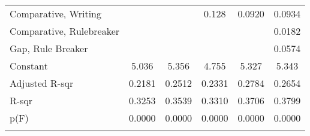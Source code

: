 {\begin{center}
{\begin{longtable}{l*{5}{c}}
Comparative, Writing &                     &                     &       0.128         &      0.0920         &      0.0934         \\
\addlinespace
Comparative, Rulebreaker &                     &                     &                     &                     &      0.0182         \\
\addlinespace
Gap, Rule Breaker        &                     &                     &                     &                     &      0.0574         \\
\addlinespace
Constant                 &       5.036\sym{***}&       5.356\sym{***}&       4.755\sym{***}&       5.327\sym{***}&       5.343\sym{***}\\
\midrule
Adjusted R-sqr           &      0.2181         &      0.2512         &      0.2331         &      0.2784         &      0.2654         \\
R-sqr                    &      0.3253         &      0.3539         &      0.3310         &      0.3706         &      0.3799         \\
p(F)                     &      0.0000         &      0.0000         &      0.0000         &      0.0000         &      0.0000         \\
\hline
\addlinespace
\multicolumn{6}{l}{\footnotesize \sym{*} \(p<0.10\), \sym{**} \(p<0.05\), \sym{***} \(p<.01\)}\\

\end{longtable}
}
\end{center}
}
